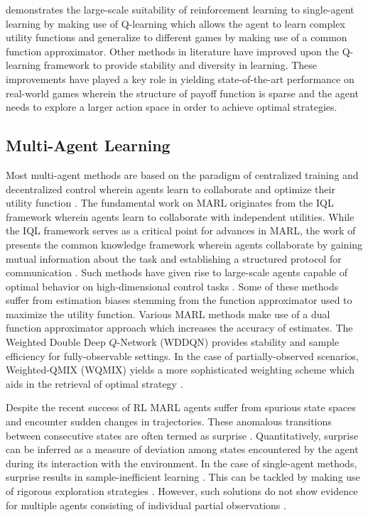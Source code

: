 \documentclass{article}
\begin{document}
\begin{multicols}{2}
\cite{atari} demonstrates the large-scale suitability of reinforcement learning to single-agent learning by making use of Q-learning \cite{rl,doubleqlearning} which allows the agent to learn complex utility functions and generalize to different games \cite{exploration} by making use of a common function approximator. Other methods in literature \cite{deepdoubleqlearning,a3c,ddpg,ppo} have improved upon the Q-learning framework to provide stability \cite{deepdoubleqlearning} and diversity \cite{haarnoja} in learning. These improvements have played a key role in yielding state-of-the-art performance \cite{alphastar} on real-world games \cite{go,shogi} wherein the structure of payoff function is sparse \cite{go} and the agent needs to explore a larger action space \cite{shogi} in order to achieve optimal strategies. 

\subsection{Multi-Agent Learning}
Most multi-agent methods are based on the paradigm of centralized training and decentralized control \cite{coma,vdn,qmix} wherein agents learn to collaborate \cite{coordinate} and optimize their utility function \cite{coordinatedrl}. The fundamental work on MARL originates from the IQL \cite{iql} framework wherein agents learn to collaborate with independent utilities. While the IQL framework serves as a critical point for advances in MARL, the work of \cite{jakob} presents the common knowledge framework wherein agents collaborate by gaining mutual information about the task and establishing a structured protocol for communication \cite{comm}. Such methods have given rise to large-scale agents capable of optimal behavior on high-dimensional control tasks \cite{maddpg,aac,rmaddpg}. Some of these methods suffer from estimation biases \cite{marlover,iqn} stemming from the function approximator \cite{double} used to maximize the utility function. Various MARL methods \cite{twinmix} make use of a dual function approximator approach which increases the accuracy of estimates. The Weighted Double Deep $Q$-Network (WDDQN) provides stability and sample efficiency for fully-observable settings. In the case of partially-observed scenarios, Weighted-QMIX (WQMIX) \cite{wqmix} yields a more sophisticated weighting scheme which aids in the retrieval of optimal strategy \cite{challenges}.

Despite the recent success of RL \cite{a3c,rainbow} MARL agents suffer from spurious state spaces and encounter sudden changes in trajectories. These anomalous transitions between consecutive states are often termed as surprise \cite{surprise}. Quantitatively, surprise can be inferred as a measure of deviation \cite{smirl,gen} among states encountered by the agent during its interaction with the environment. In the case of single-agent methods, surprise results in sample-inefficient learning \cite{surprise}. This can be tackled by making use of rigorous exploration strategies \cite{effectiveexp,statemarginal}. However, such solutions do not show evidence for multiple agents consisting of individual partial observations \cite{marlsurp}.


\end{multicols}
\end{document}
